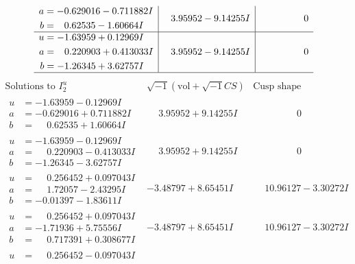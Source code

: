 \documentclass[1p]{elsarticle_modified}
\theoremstyle{definition}
\newcommand{\I}{\sqrt{-1}}
\begin{document}
$$\begin{array}{c|c|c}
\begin{aligned}
a &= -0.629016 - 0.711882 I \\
b &= \phantom{-}0.62535 - 1.60664 I\end{aligned}
 & \phantom{-}3.95952 - 9.14255 I & \phantom{-0.000000 } 0 \\ \hline\begin{aligned}
u &= -1.63959 + 0.12969 I \\
a &= \phantom{-}0.220903 + 0.413033 I \\
b &= -1.26345 + 3.62757 I\end{aligned}
 & \phantom{-}3.95952 - 9.14255 I & \phantom{-0.000000 } 0\\
 \hline 
 \end{array}$$\newpage$$\begin{array}{c|c|c}  
\text{Solutions to }I^u_{2}& \I (\text{vol} + \sqrt{-1}CS) & \text{Cusp shape}\\
 \hline 
\begin{aligned}
u &= -1.63959 - 0.12969 I \\
a &= -0.629016 + 0.711882 I \\
b &= \phantom{-}0.62535 + 1.60664 I\end{aligned}
 & \phantom{-}3.95952 + 9.14255 I & \phantom{-0.000000 } 0 \\ \hline\begin{aligned}
u &= -1.63959 - 0.12969 I \\
a &= \phantom{-}0.220903 - 0.413033 I \\
b &= -1.26345 - 3.62757 I\end{aligned}
 & \phantom{-}3.95952 + 9.14255 I & \phantom{-0.000000 } 0 \\ \hline\begin{aligned}
u &= \phantom{-}0.256452 + 0.097043 I \\
a &= \phantom{-}1.72057 - 2.43295 I \\
b &= -0.01397 - 1.83611 I\end{aligned}
 & -3.48797 + 8.65451 I & \phantom{-}10.96127 - 3.30272 I \\ \hline\begin{aligned}
u &= \phantom{-}0.256452 + 0.097043 I \\
a &= -1.71936 + 5.75556 I \\
b &= \phantom{-}0.717391 + 0.308677 I\end{aligned}
 & -3.48797 + 8.65451 I & \phantom{-}10.96127 - 3.30272 I \\ \hline\begin{aligned}
u &= \phantom{-}0.256452 - 0.097043 I \\

\end{aligned}
\end{array}$$
\end{document}
